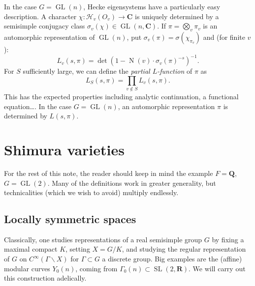 \documentclass[11pt]{article}
\DeclareMathOperator{\GL}{GL}
\DeclareMathOperator{\norm}{N}
\DeclareMathOperator{\SL}{SL}
\newcommand{\dC}{\mathbf{C}}
\newcommand{\dR}{\mathbf{R}}
\newcommand{\dQ}{\mathbf{Q}}
\newcommand{\hecke}{\mathcal{H}}
\begin{document}
In the case $G=\GL(n)$, Hecke eigensystems have a particularly easy 
description. A character $\chi:\hecke_v(O_v)\to \dC$ is uniquely determined by 
a semisimple conjugacy class $\sigma_v(\chi)\in \GL(n,\dC)$. If 
$\pi=\bigotimes_v \pi_v$ is an automorphic representation of $\GL(n)$, put 
$\sigma_v(\pi) = \sigma(\chi_{\pi_v})$ and (for finite $v$): 
\[
  L_v(s,\pi) = \det\left(1-\norm(v)\cdot \sigma_v(\pi)^{-s}\right)^{-1} .
\]
For $S$ sufficiently large, we can define the \emph{partial $L$-function} of 
$\pi$ as 
\[
  L_S(s,\pi) = \prod_{v\notin S} L_v(s,\pi) .
\]
This has the expected properties including analytic continuation, a functional 
equation\ldots. In the case $G=\GL(n)$, an automorphic representation $\pi$ is 
determined by $L(s,\pi)$. 





\section{Shimura varieties}

For the rest of this note, the reader should keep in mind the example 
$F=\dQ$, $G=\GL(2)$. Many of the definitions work in greater generality, 
but technicalities (which we wish to avoid) multiply endlessly. 


\subsection{Locally symmetric spaces}\label{sec:local-symm}

Classically, one studies representations of a real semisimple group $G$ by 
fixing a maximal compact $K$, setting $X=G/K$, and studying the regular 
representation of $G$ on $C^\infty(\Gamma\backslash X)$ for $\Gamma\subset G$ 
a discrete group. Big examples are the (affine) modular curves $Y_0(n)$, 
coming from $\Gamma_0(n)\subset \SL(2,\dR)$. We will carry out this 
construction adelically. 
\end{document}
